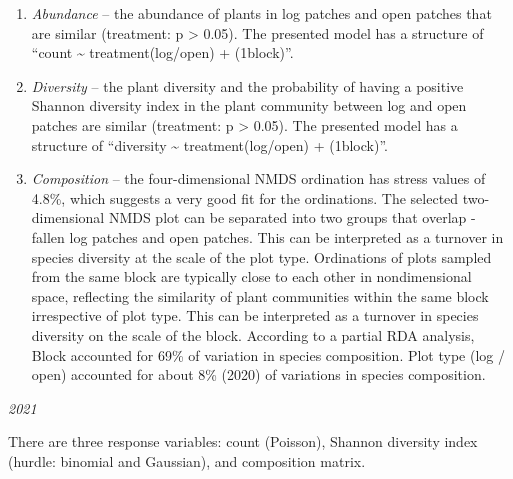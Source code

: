 \documentclass[
]{article}
\providecommand{\tightlist}{%
  \setlength{\itemsep}{0pt}\setlength{\parskip}{0pt}}
\begin{document}
\begin{enumerate}
\def\labelenumi{\arabic{enumi}.}
\tightlist
\item
  \emph{Abundance} -- the abundance of plants in log patches and open
  patches that are similar (treatment: p \textgreater{} 0.05). The
  presented model has a structure of ``count \textasciitilde{}
  treatment(log/open) + (1\textbar block)''.
\item
  \emph{Diversity} -- the plant diversity and the probability of having
  a positive Shannon diversity index in the plant community between log
  and open patches are similar (treatment: p \textgreater{} 0.05). The
  presented model has a structure of ``diversity \textasciitilde{}
  treatment(log/open) + (1\textbar block)''.
\item
  \emph{Composition} -- the four-dimensional NMDS ordination has stress
  values of 4.8\%, which suggests a very good fit for the ordinations.
  The selected two-dimensional NMDS plot can be separated into two
  groups that overlap - fallen log patches and open patches. This can be
  interpreted as a turnover in species diversity at the scale of the
  plot type. Ordinations of plots sampled from the same block are
  typically close to each other in nondimensional space, reflecting the
  similarity of plant communities within the same block irrespective of
  plot type. This can be interpreted as a turnover in species diversity
  on the scale of the block. According to a partial RDA analysis, Block
  accounted for 69\% of variation in species composition. Plot type (log
  / open) accounted for about 8\% (2020) of variations in species
  composition.
\end{enumerate}

\emph{2021}

There are three response variables: count (Poisson), Shannon diversity
index (hurdle: binomial and Gaussian), and composition matrix.
\end{document}
